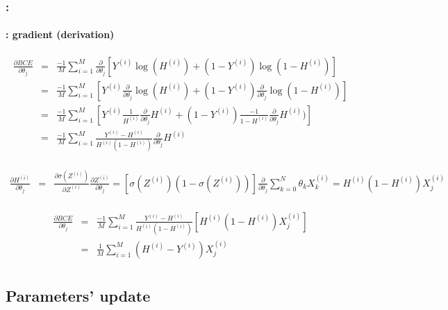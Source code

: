 \documentclass[xcolor=table]{beamer}
\begin{document}
\begin{frame}
	\frametitle{\insertshortsubtitle: \insertsection}
	\framesubtitle{\insertsubsection: gradient (derivation)}
	
	\scriptsize
	\vspace{-16pt}
	\begin{align*}
	\frac{\partial BCE}{\partial \theta_j} 
	& = & \frac{-1}{M} \sum\limits_{i=1}^{M} \frac{\partial}{\partial \theta_j} [Y^{(i)} \log(H^{(i)}) + (1- Y^{(i)}) \log(1 - H^{(i)})] \\
	& = & \frac{-1}{M} \sum\limits_{i=1}^{M} [ Y^{(i)} \frac{\partial}{\partial \theta_j} \log(H^{(i)}) + (1- Y^{(i)}) \frac{\partial}{\partial \theta_j}\log(1 - H^{(i)})]\\
	& = & \frac{-1}{M} \sum\limits_{i=1}^{M} [ Y^{(i)} \frac{1}{H^{(i)}} \frac{\partial}{\partial \theta_j} H^{(i)} + (1- Y^{(i)}) \frac{-1}{1-H^{(i)}} \frac{\partial}{\partial \theta_j} H^{(i)})] \\
	& = & \frac{-1}{M} \sum\limits_{i=1}^{M} \frac{Y^{(i)}-H^{(i)}}{H^{(i)}(1-H^{(i)})} \frac{\partial}{\partial \theta_j} H^{(i)} \\
	\end{align*}
	
	\vspace{-26pt}
	\begin{align*}
	\frac{\partial H^{(i)}}{\partial \theta_j} 
	& = & \frac{\partial \sigma(Z^{(i)})}{\partial Z^{(i)}} \frac{\partial Z^{(i)}}{\partial \theta_j}
	 =  [\sigma(Z^{(i)}) (1-\sigma(Z^{(i)}))]\frac{\partial}{\partial \theta_j} \sum\limits_{k=0}^{N} \theta_k X_k^{(i)} 
	 =  H^{(i)} (1-H^{(i)})  X_j^{(i)}\\
	\end{align*}
	
	\vspace{-24pt}
	\begin{align*}
	\frac{\partial BCE}{\partial \theta_j} 
	& = & \frac{-1}{M} \sum\limits_{i=1}^{M} \frac{Y^{(i)}-H^{(i)}}{H^{(i)}(1-H^{(i)})} [H^{(i)} (1-H^{(i)}) X_j^{(i)}] \\
	& = & \frac{1}{M} \sum\limits_{i=1}^{M} (H^{(i)} - Y^{(i)}) X_j^{(i)}\\
	\end{align*}
		
\end{frame}

\subsection{Parameters' update}
\end{document}
